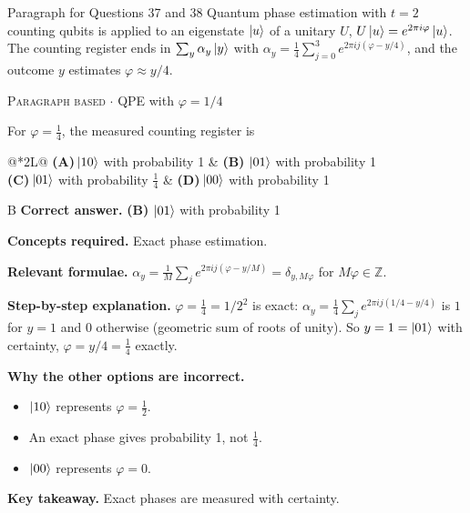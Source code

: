 \documentclass[11pt,a4paper]{article}
\newcommand{\optlabel}[1]{\textbf{(#1)}}
\newcommand{\correctlabel}[1]{\textcolor{okgreen}{\textbf{(#1)}\,\ding{51}}}
\newenvironment{qitem}[1]{\begin{list}{}{\setlength{\leftmargin}{3.3em}\setlength{\labelwidth}{3.1em}%
  \setlength{\labelsep}{0.2em}\setlength{\topsep}{3pt}\setlength{\parsep}{3pt}}\item[\textbf{Q.#1}\hfill]}{\end{list}}
\newcommand{\qsep}{\par\vspace{2pt}{\color{black!15}\hrule}\vspace{4pt}}
\newcommand{\qmeta}[2]{{\footnotesize\color{black!60}\textsc{#1} \;$\cdot$\; #2}\par}
\begin{document}
\begin{passagebox}{Paragraph for Questions 37 and 38}
Quantum phase estimation with $t = 2$ counting qubits is applied to an eigenstate $\ket u$ of a unitary $U$, $U\ket u = e^{2\pi i\varphi}\ket u$. The counting
register ends in $\sum_y\alpha_y\ket y$ with $\alpha_y = \frac14\sum_{j=0}^{3}e^{2\pi i j(\varphi - y/4)}$, and the outcome $y$ estimates $\varphi \approx y/4$.
\end{passagebox}
\begin{qitem}{37}
\qmeta{Paragraph based}{QPE with $\varphi = 1/4$}
For $\varphi = \tfrac14$, the measured counting register is
\par\smallskip\noindent\begin{tabularx}{\linewidth}{@{}*{2}{L}@{}}
\optlabel{A}\,$\ket{10}$ with probability 1 & \correctlabel{B}\,$\ket{01}$ with probability 1 \\[3pt]
\optlabel{C}\,$\ket{01}$ with probability $\tfrac14$ & \optlabel{D}\,$\ket{00}$ with probability 1
\end{tabularx}
\end{qitem}
\begin{solbox}{B}
\textbf{\color{brand}Correct answer.} \textcolor{okgreen}{\textbf{(B)}} $\ket{01}$ with probability 1

\textbf{\color{brand}Concepts required.} Exact phase estimation.

\textbf{\color{brand}Relevant formulae.} $\alpha_y = \frac1M\sum_je^{2\pi ij(\varphi - y/M)} = \delta_{y, M\varphi}$ for $M\varphi \in \mathbb Z$.

\textbf{\color{brand}Step-by-step explanation.} $\varphi = \tfrac14 = 1/2^2$ is exact: $\alpha_y = \frac14\sum_je^{2\pi ij(1/4 - y/4)}$ is $1$ for $y = 1$ and $0$ otherwise (geometric sum of roots of unity). So $y = 1 = \ket{01}$ with
certainty, $\varphi = y/4 = \tfrac14$ exactly.

\textbf{\color{brand}Why the other options are incorrect.}
\begin{itemize}[leftmargin=2.4em, itemsep=1pt, topsep=2pt]
\item[\textbf{(A)}] $\ket{10}$ represents $\varphi = \frac12$.
\item[\textbf{(C)}] An exact phase gives probability 1, not $\frac14$.
\item[\textbf{(D)}] $\ket{00}$ represents $\varphi = 0$.
\end{itemize}
\textbf{\color{brand}Key takeaway.} Exact phases are measured with certainty.
\end{solbox}
\qsep
\end{document}

